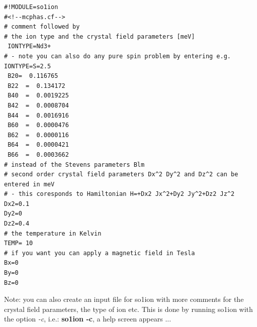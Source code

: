 \begin{verbatim}
#!MODULE=so1ion
#<!--mcphas.cf-->
# comment followed by
# the ion type and the crystal field parameters [meV]
 IONTYPE=Nd3+
# - note you can also do any pure spin problem by entering e.g. IONTYPE=S=2.5 
 B20=  0.116765                                           
 B22  =  0.134172                                           
 B40  =  0.0019225                                          
 B42  =  0.0008704                                          
 B44  =  0.0016916                                          
 B60  =  0.0000476                                          
 B62  =  0.0000116                                          
 B64  =  0.0000421                                          
 B66  =  0.0003662       
# instead of the Stevens parameters Blm 
# second order crystal field parameters Dx^2 Dy^2 and Dz^2 can be entered in meV
# - this coresponds to Hamiltonian H=+Dx2 Jx^2+Dy2 Jy^2+Dz2 Jz^2
Dx2=0.1
Dy2=0
Dz2=0.4
# the temperature in Kelvin
TEMP= 10
# if you want you can apply a magnetic field in Tesla
Bx=0
By=0
Bz=0
\end{verbatim}

Note: you can also create an input file for so1ion with more comments for the crystal field
parameters, the type of ion etc. This is done by running {\prg so1ion} with the
option {\em -c}, i.e.: {\bf so1ion -c}, a help screen appears ...

